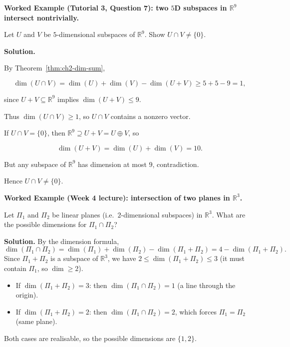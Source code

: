 \begin{examplebox}

\textbf{Worked Example (Tutorial 3, Question 7): two $5$D subspaces in $\mathbb{R}^9$ intersect nontrivially.}

Let $U$ and $V$ be $5$-dimensional subspaces of $\mathbb{R}^9$. Show $U\cap V\neq\{0\}$.

\medskip

\textbf{Solution.}

By Theorem~\ref{thm:ch2-dim-sum},

\[
\dim(U\cap V)=\dim(U)+\dim(V)-\dim(U+V)\ge 5+5-9=1,
\]

since $U+V\subseteq\mathbb{R}^9$ implies $\dim(U+V)\le 9$.

Thus $\dim(U\cap V)\ge 1$, so $U\cap V$ contains a nonzero vector.

\end{examplebox}

\begin{extension}[title={Extension (Tutorial 3, Question 7, Method 2)}]

If $U\cap V=\{0\}$, then $\mathbb{R}^9\supseteq U+V=U\oplus V$, so

\[
\dim(U+V)=\dim(U)+\dim(V)=10.
\]

But any subspace of $\mathbb{R}^9$ has dimension at most $9$, contradiction.

Hence $U\cap V\neq\{0\}$.

\end{extension}

\begin{examplebox}
\textbf{Worked Example (Week 4 lecture): intersection of two planes in $\mathbb{R}^3$.}

Let $\Pi_1$ and $\Pi_2$ be linear planes (i.e.\ $2$-dimensional subspaces) in $\mathbb{R}^3$.
What are the possible dimensions for $\Pi_1\cap\Pi_2$?

\medskip

\textbf{Solution.}
By the dimension formula,
\[
\dim(\Pi_1\cap\Pi_2)=\dim(\Pi_1)+\dim(\Pi_2)-\dim(\Pi_1+\Pi_2)=4-\dim(\Pi_1+\Pi_2).
\]
Since $\Pi_1+\Pi_2$ is a subspace of $\mathbb{R}^3$, we have $2\le\dim(\Pi_1+\Pi_2)\le 3$ (it must contain $\Pi_1$, so $\dim\ge 2$).

\begin{itemize}[leftmargin=*]
\item If $\dim(\Pi_1+\Pi_2)=3$: then $\dim(\Pi_1\cap\Pi_2)=1$ (a line through the origin).
\item If $\dim(\Pi_1+\Pi_2)=2$: then $\dim(\Pi_1\cap\Pi_2)=2$, which forces $\Pi_1=\Pi_2$ (same plane).
\end{itemize}
Both cases are realisable, so the possible dimensions are $\{1,2\}$.
\end{examplebox}

